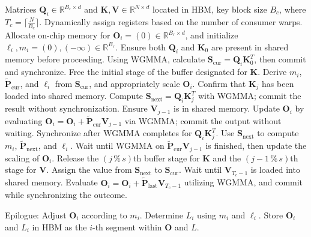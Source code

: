\begin{algorithm}[H]
    \caption{\small\label{alg:flash3_wgmma}\textsc{FlashAttention-3} consumer warpgroup forward pass}
    \begin{algorithmic}[1]
      \REQUIRE  Matrices $\mathbf{Q}_i \in \mathbb{R}^{B_r \times d}$ and $\mathbf{K}, \mathbf{V} \in \mathbb{R}^{N \times d}$ located in HBM, key block size $B_c$, where $T_c = \lceil \frac{N}{B_c} \rceil$.
      \STATE Dynamically assign registers based on the number of consumer warps.
      \STATE Allocate on-chip memory for $\mathbf{O}_i = (0) \in \mathbb{R}^{B_r \times d}$, and initialize $\ell_i, m_i = (0), (-\infty) \in \mathbb{R}^{B_r}$.
      \STATE Ensure both $\mathbf{Q}_i$ and $\mathbf{K}_0$ are present in shared memory before proceeding.
      \STATE Using WGMMA, calculate $\mathbf{S}_{\mathrm{cur}} = \mathbf{Q}_i \mathbf{K}_0^T$, then commit and synchronize.
      \STATE Free the initial stage of the buffer designated for $\mathbf{K}$.
      \STATE Derive $m_{i}$, $\tilde{\mathbf{P}}_{\mathrm{cur}}$, and $\ell_{i}$ from $\mathbf{S}_{\mathrm{cur}}$, and appropriately scale $\mathbf{O}_i$.
        \STATE Confirm that $\mathbf{K}_j$ has been loaded into shared memory.
        \label{code:mainloop_start}
        \STATE Compute $\mathbf{S}_{\mathrm{next}} = \mathbf{Q}_i \mathbf{K}_{j}^T$ with WGMMA; commit the result without synchronization. \label{code:first_wgmma}
        \STATE Ensure $\mathbf{V}_{j-1}$ is in shared memory.
        \STATE Update $\mathbf{O}_{i}$ by evaluating $\mathbf{O}_{i} = \mathbf{O}_{i} + \tilde{\mathbf{P}}_{\mathrm{cur}} \mathbf{V}_{j-1}$ via WGMMA; commit the output without waiting. \label{code:second_wgmma}
        \STATE Synchronize after WGMMA completes for $\mathbf{Q}_i \mathbf{K}_{j}^T$.
        \STATE Use $\mathbf{S}_{\mathrm{next}}$ to compute $m_{i}$, $\tilde{\mathbf{P}}_{\mathrm{next}}$, and $\ell_{i}$. \label{code:softmax}
        \STATE Wait until WGMMA on $\tilde{\mathbf{P}}_{\mathrm{cur}} \mathbf{V}_{j-1}$ is finished, then update the scaling of $\mathbf{O}_i$.
        \STATE Release the $(j\,\%\,s)$th buffer stage for $\mathbf{K}$ and the $(j-1\,\%\,s)$th stage for $\mathbf{V}$.
        \STATE Assign the value from $\mathbf{S}_{\mathrm{next}}$ to $\mathbf{S}_{\mathrm{cur}}$.
        \label{code:mainloop_end}
      \ENDFOR \STATE Wait until $\mathbf{V}_{T_c - 1}$ is loaded into shared memory.
      \STATE Evaluate
      $\mathbf{O}_{i} = \mathbf{O}_{i} + \tilde{\mathbf{P}}_{\mathrm{last}} \mathbf{V}_{T_c - 1}$ utilizing WGMMA, and commit while synchronizing the outcome.

\STATE Epilogue: Adjust $\mathbf{O}_{i}$ according to $m_{i}$. Determine $L_{i}$ using $m_{i}$ and $\ell_{i}$.
Store $\mathbf{O}_{i}$ and $L_{i}$ in HBM as the $i$-th segment within $\mathbf{O}$ and $L$.
\end{algorithmic}
\end{algorithm}

